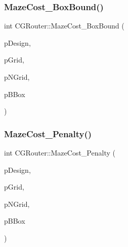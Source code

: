 \subsubsection{\texorpdfstring{MazeCost\_BoxBound()}{MazeCost\_BoxBound()}}
{\footnotesize\ttfamily int C\+G\+Router\+::\+Maze\+Cost\+\_\+\+Box\+Bound (\begin{DoxyParamCaption}\item[{\mbox{\hyperlink{classCDesign}{C\+Design}} $\ast$}]{p\+Design,  }\item[{\mbox{\hyperlink{classCGrid}{C\+Grid}} $\ast$}]{p\+Grid,  }\item[{\mbox{\hyperlink{classCGrid}{C\+Grid}} $\ast$}]{p\+N\+Grid,  }\item[{\mbox{\hyperlink{classCBBox}{C\+B\+Box}} $\ast$}]{p\+B\+Box }\end{DoxyParamCaption})\hspace{0.3cm}{\ttfamily [static]}}

\mbox{\label{classCGRouter_a2ba5fe73784853f2e71d2b3a04a163ec}} 
\subsubsection{\texorpdfstring{MazeCost\_Penalty()}{MazeCost\_Penalty()}}
{\footnotesize\ttfamily int C\+G\+Router\+::\+Maze\+Cost\+\_\+\+Penalty (\begin{DoxyParamCaption}\item[{\mbox{\hyperlink{classCDesign}{C\+Design}} $\ast$}]{p\+Design,  }\item[{\mbox{\hyperlink{classCGrid}{C\+Grid}} $\ast$}]{p\+Grid,  }\item[{\mbox{\hyperlink{classCGrid}{C\+Grid}} $\ast$}]{p\+N\+Grid,  }\item[{\mbox{\hyperlink{classCBBox}{C\+B\+Box}} $\ast$}]{p\+B\+Box }\end{DoxyParamCaption})\hspace{0.3cm}{\ttfamily [static]}}

\mbox{\label{classCGRouter_a28532892b517c1142198ac3d8fb07583}} 
